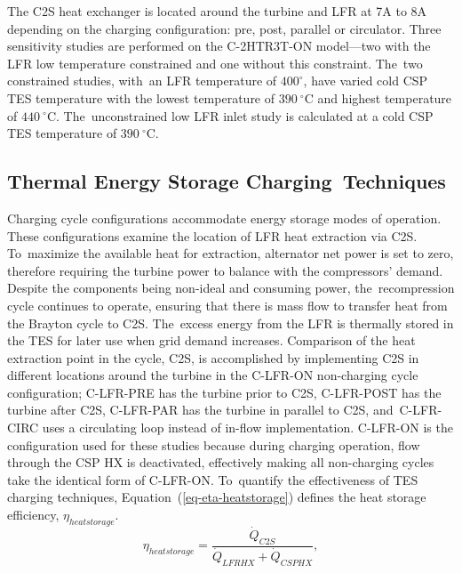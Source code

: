 \documentclass[sustainability,article,accept,moreauthors,pdftex]{Definitions/mdpi}
\begin{document}
\begin{paracol}{2}
\switchcolumn

The C2S heat exchanger is located around the turbine and LFR at 7A to 8A depending on the charging configuration: pre, post, parallel or circulator. Three sensitivity studies are performed on the C-2HTR3T-ON model---two with the LFR low temperature constrained and one without this constraint. The~two constrained studies, with~an LFR temperature of $400^{\circ}$, have varied cold CSP TES temperature with the lowest temperature of $390~^{\circ}$C and highest temperature of $440~^{\circ}$C. The~unconstrained low LFR inlet study is calculated at a cold CSP TES temperature of $390~^{\circ}$C.



\subsection{Thermal Energy Storage Charging~Techniques} 

Charging cycle configurations accommodate energy storage modes of operation. These configurations examine the location of LFR heat extraction via C2S. To~maximize the available heat for extraction, alternator net power is set to zero, therefore requiring the turbine power to balance with the compressors' demand. Despite the components being non-ideal and consuming power, the~recompression cycle continues to operate, ensuring that there is mass flow to transfer heat from the Brayton cycle to C2S. The~excess energy from the LFR is thermally stored in the TES for later use when grid demand increases. Comparison of the heat extraction point in the cycle, C2S, is accomplished by implementing C2S in different locations around the turbine in the C-LFR-ON non-charging cycle configuration; C-LFR-PRE has the turbine prior to C2S, C-LFR-POST has the turbine after C2S, C-LFR-PAR has the turbine in parallel to C2S, and~C-LFR-CIRC uses a circulating loop instead of in-flow implementation. C-LFR-ON is the configuration used for these studies because during charging operation, flow through the CSP HX is deactivated, effectively making all non-charging cycles take the identical form of C-LFR-ON. To~quantify the effectiveness of TES charging techniques, Equation~(\ref{eq-eta-heatstorage}) defines the heat storage efficiency, $\eta_{heatstorage}$.
\begin{equation}
    \label{eq-eta-heatstorage}
    \eta_{heatstorage} = \frac{\dot{Q}_{C2S}}{\dot{Q}_{LFRHX}+\dot{Q}_{CSPHX}},
\end{equation}


\end{paracol}
\end{document}
